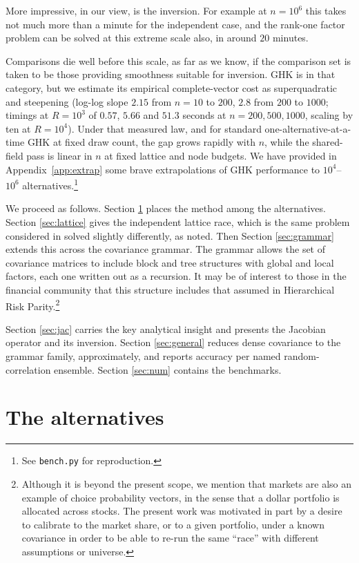\documentclass[11pt]{article}
\begin{document}
More impressive, in our view, is the inversion. For example at $n=10^{6}$ this takes not much more than a minute for the independent case, and the rank-one factor problem can be solved at this
extreme scale also, in around $20$ minutes.

Comparisons die well before this scale, as far as we know, if the comparison set is taken to be those providing smoothness suitable for inversion. GHK is in that category, but we estimate its empirical complete-vector cost as superquadratic and steepening (log-log slope
$2.15$ from $n=10$ to $200$, $2.8$ from $200$ to $1000$; timings at
$R=10^{3}$ of $0.57$, $5.66$ and $51.3$ seconds at $n=200,500,1000$,
scaling by ten at $R=10^{4}$). Under that measured law, and for standard
one-alternative-at-a-time GHK at fixed draw count, the gap grows
rapidly with $n$, while the shared-field pass is linear in $n$ at fixed
lattice and node budgets. We have provided in Appendix~\ref{app:extrap} some brave extrapolations of GHK performance to
$10^{4}$--$10^{6}$ alternatives.\footnote{See \texttt{bench.py} for reproduction.}

We proceed as follows. Section \ref{sec:alternatives} places the method among the alternatives.
Section \ref{sec:lattice} gives the independent lattice race, which is the same problem considered in \citet{cotton2021} solved slightly differently, as noted. Then Section
\ref{sec:grammar} extends this across the covariance grammar. The grammar allows the set of covariance matrices to include block and tree structures with global and local factors, each one written out as a recursion. It may be of interest to those in the financial community that this structure includes that assumed in Hierarchical Risk Parity.\footnote{Although it is beyond the present scope, we mention that markets are also an example of choice probability vectors, in the sense that a dollar portfolio is allocated across stocks. The present work was motivated in part by a desire to calibrate to the market share, or to a given portfolio, under a known covariance in order to be able to re-run the same ``race'' with different assumptions or universe.}

Section \ref{sec:jac} carries the key analytical insight and presents
the Jacobian operator and its inversion. Section \ref{sec:general} reduces
dense covariance to the grammar family, approximately, and reports accuracy
per named random-correlation ensemble. Section \ref{sec:num} contains the
benchmarks.

\section{The alternatives}\label{sec:alternatives}
\end{document}
